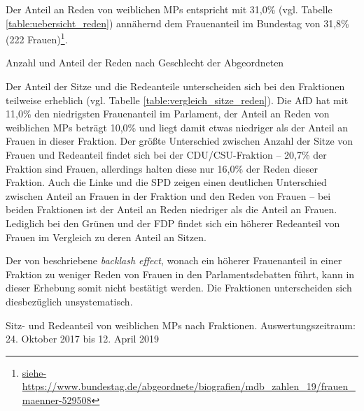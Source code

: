 \documentclass[12pt, 
    twoside=false, 
    bibliography=totoc, 
    numbers=endperiod, 
    headings=normal, 
    toc=chapterentrydotfill
    ]{scrbook}
\begin{document}
Der Anteil an Reden von weiblichen MPs entspricht mit 31,0\% (vgl. Tabelle \ref{table:uebersicht_reden}) annähernd dem Frauenanteil im Bundestag von 31,8\% (222 Frauen)\footnote{\url{siehe-https://www.bundestag.de/abgeordnete/biografien/mdb_zahlen_19/frauen_maenner-529508}}.


\begin{table}[htb]
    \centering
    \caption{Anzahl und Anteil der Reden nach Geschlecht der Abgeordneten}
    
    \label{table:uebersicht_reden}
\end{table}

Der Anteil der Sitze und die Redeanteile unterscheiden sich bei den Fraktionen teilweise erheblich (vgl. Tabelle \ref{table:vergleich_sitze_reden}). Die AfD hat mit 11,0\% den niedrigsten Frauenanteil im Parlament, der Anteil an Reden von weiblichen MPs beträgt 10,0\% und liegt damit etwas niedriger als der Anteil an Frauen in dieser Fraktion. 
Der größte Unterschied zwischen Anzahl der Sitze von Frauen und Redeanteil findet sich bei der CDU/CSU-Fraktion -- 20,7\% der Fraktion sind Frauen, allerdings halten diese nur 16,0\% der Reden dieser Fraktion. Auch die Linke und die SPD zeigen  einen deutlichen Unterschied zwischen Anteil an Frauen in der Fraktion und den Reden von Frauen -- bei beiden Fraktionen ist der Anteil an Reden niedriger als die Anteil an Frauen. Lediglich bei den Grünen und der FDP findet sich ein höherer Redeanteil von Frauen im Vergleich zu deren Anteil an Sitzen.

Der von \textcite{back_2018} beschriebene \emph{backlash effect}, wonach ein höherer Frauenanteil in einer Fraktion zu weniger Reden von Frauen in den Parlamentsdebatten führt, kann in dieser Erhebung somit nicht bestätigt werden. Die Fraktionen unterscheiden sich diesbezüglich unsystematisch.

\begin{table}[htb]
    \centering
    \caption[Sitz- und Redeanteil von weiblichen MPs nach Fraktionen]{Sitz- und Redeanteil von weiblichen MPs nach Fraktionen. Auswertungszeitraum: 24. Oktober 2017 bis 12. April 2019}
    
    \label{table:vergleich_sitze_reden}
\end{table}
\end{document}
